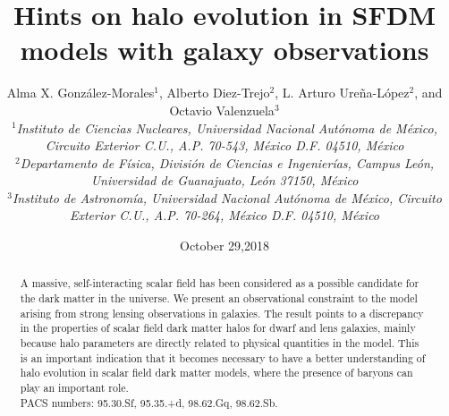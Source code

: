 \documentclass[%
 twocolumn,
 amsmath,amssymb,
 aps,
]{revtex4-2}
\begin{document}


\title{ \Large Hints on halo evolution in SFDM models with galaxy observations}

\author{Alma X. González-Morales$^{1}$, Alberto Diez-Trejo$^{2}$, L. Arturo Ureña-López$^{2}$, and Octavio Valenzuela$^{3}$\\
\small{\textit{$^{1}$Instituto de Ciencias Nucleares, Universidad Nacional Autónoma de México,
Circuito Exterior C.U., A.P. 70-543, México D.F. 04510, México}}\\
\small{\textit{$^{2}$Departamento de Física, División de Ciencias e Ingenierías,
Campus León, Universidad de Guanajuato, León 37150, México}}\\
\small{\textit{$^{3}$Instituto de Astronomía, Universidad Nacional Autónoma de México,
Circuito Exterior C.U., A.P. 70-264, México D.F. 04510, México}}}\\




\date{October 29,2018}

\begin{abstract}
A massive, self-interacting scalar field has been considered as a possible candidate for the dark
matter in the universe. We present an observational constraint to the model arising from strong
lensing observations in galaxies. The result points to a discrepancy in the properties of scalar field
dark matter halos for dwarf and lens galaxies, mainly because halo parameters are directly related
to physical quantities in the model. This is an important indication that it becomes necessary to
have a better understanding of halo evolution in scalar field dark matter models, where the presence
of baryons can play an important role.\\

PACS numbers: 95.30.Sf, 95.35.+d, 98.62.Gq, 98.62.Sb.
\end{abstract}


\maketitle{}
\end{document}
